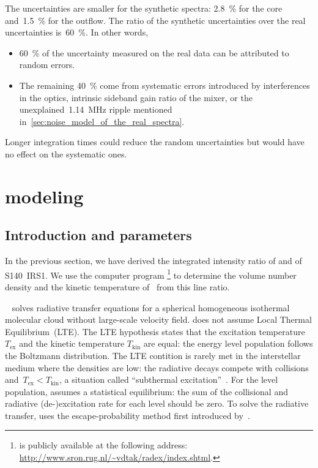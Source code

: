 The uncertainties are smaller for the synthetic spectra:
	\SI{2.8}{\percent} for the core
and~\SI{1.5}{\percent} for the outflow.
The ratio of the synthetic uncertainties over the real uncertainties is~\SI{60}{\percent}.
In other words,
\begin{itemize}
    \item \SI{60}{\percent} of the uncertainty measured on the real data can be attributed to random errors.
    \item The remaining \SI{40}{\percent} come from systematic errors introduced by
          interferences in the optics,
          intrinsic sideband gain ratio of the mixer,
          or the unexplained~\SI{1.14}{\mega\hertz} ripple mentioned
          in~\cref{sec:noise_model_of_the_real_spectra}.
\end{itemize}
Longer integration times could reduce the random uncertainties but would have no effect on the systematic ones.






\FloatBarrier
\section{\Radex{} modeling}



\subsection{Introduction and parameters}
In the previous section, we have derived the integrated intensity ratio of
 and  of S140~IRS1.
We use the computer program \radex{}%
\footnote{
    \Radex{} is publicly available at the following address:\\
    \url{http://www.sron.rug.nl/~vdtak/radex/index.shtml}.
}
to determine the volume number density and the kinetic temperature of~ from this line ratio.

\Radex{}~\parencite{vandertak2007radex} solves radiative transfer equations for a spherical homogeneous isothermal molecular cloud without large-scale velocity field.
\Radex{} does not assume Local Thermal Equilibrium~(LTE).
The LTE hypothesis states that the excitation temperature $T_\text{ex}$ and the kinetic temperature $T_\text{kin}$ are equal: the energy level population follows the Boltzmann distribution.
The LTE contition is rarely met in the interstellar medium where the densities are low:
the radiative decays compete with collisions and~$T_\text{ex}<T_\text{kin}$, a situation called ``subthermal excitation''~\parencite{vandertak2011radiative}.
For the level population, \radex{} assumes a statistical equilibrium: the sum of the collisional and radiative (de-)excitation rate for each level should be zero.
To solve the radiative transfer, \radex{} uses the escape-probability method first introduced by~\textcite{sobolev1960}.

